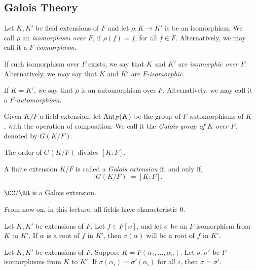 
\subsection{Galois Theory}

\begin{defn}
	Let $K, K'$ be field extensions of $F$ and let $\rho: K \to K'$ is be an isomorphism. We call $\rho$ an \emph{isomorphism over $F$,} if $\rho(f) = f$, for all $f \in F$. Alternatively, we may call it a \emph{$F$-isomorphism}.

	If such isomorphism over $F$ exists, we say that $K$ and $K'$ are \emph{isomorphic over $F$}. Alternatively, we may say that $K$ and $K'$ are \emph{$F$-isomorphic}.

	If $K = K'$, we say that $\rho$ is an automorphism over $F$. Alternatively, we may call it a \emph{$F$-automorphism}.
\end{defn}

\begin{defn}
	Given $K / F$ a field extension, let $\operatorname{Aut}_F(K)$ be the group of $F$-automorphisms of $K$, with the operation of composition. We call it the \emph{Galois group of $K$ over $F$}, denoted by $G(K/F)$.
\end{defn}

\begin{prop}
	The order of $G(K/F)$ divides $[K:F]$.
\end{prop}

\begin{defn}
	A finite extension $K/F$ is called a \emph{Galois extension} if, and only if,  \[
		|G(K/F)| = [K : F].
	\]
\end{defn}

\begin{exmp}
	$\CC/\RR$ is a Galois extension.
\end{exmp}

From now on, in this lecture, all fields have characteristic $0$.

\begin{lem}
	Let $K, K'$ be extensions of $F$. 
	Let $f \in F[x]$, and let $\sigma$ be an $F$-isomorphism from $K$ to $K'$.
	If $\alpha$ is a root of $f$ in $K'$, then $\sigma(\alpha)$ will be a root of $f$ in $K'$.
\end{lem}

\begin{lem}
	Let $K, K'$ be extensions of $F$.
	Suppose $K = F(\alpha_1, \dots, \alpha_n)$. Let $\sigma, \sigma'$ be $F$-isomorphisms from $K$ to $K'$.
	If $\sigma(\alpha_i) = \sigma'(\alpha_i)$ for all  $i$, then $\sigma = \sigma'$.
\end{lem}

